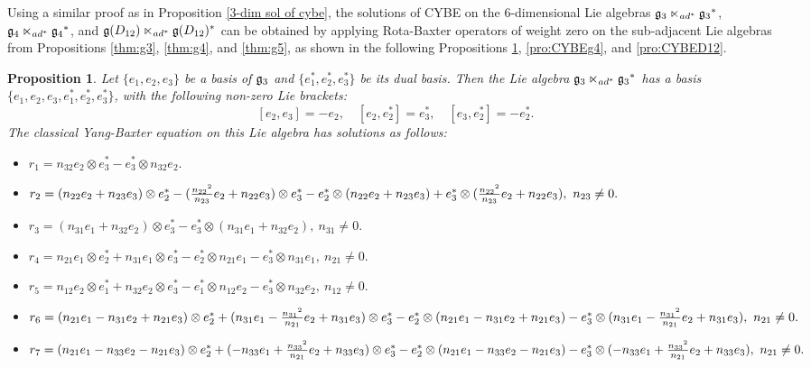 \documentclass[12pt, reqno]{amsart}
\theoremstyle{plain}
\newtheorem{proposition}[theorem]{Proposition}
\begin{document}
Using a similar proof as in Proposition \ref{3-dim sol of cybe}, the solutions of CYBE on the 6-dimensional Lie algebras ${\frak g_3} \ltimes_{{\rm ad}^{\ast}} {\frak g_3}^{\ast}$, ${\frak g_4} \ltimes_{{\rm ad}^{\ast}} {\frak g_4}^{\ast}$, and ${\frak g}(D_{12}) \ltimes_{{\rm ad}^{\ast}} {\frak g}(D_{12})^{\ast}$ can be obtained by applying Rota-Baxter operators of weight zero on the sub-adjacent Lie algebras from Propositions \ref{thm:g3}, \ref{thm:g4}, and \ref{thm:g5}, as shown in the following Propositions \ref{pro:CYBEg3}, \ref{pro:CYBEg4}, and \ref{pro:CYBED12}.
\begin{proposition}\label{pro:CYBEg3}
Let $\{e_{1}, e_{2}, e_{3}\}$ be a basis of ${\frak g_3}$ and $\{e^{\ast}_{1}, e^{\ast}_{2}, e^{\ast}_{3}\}$ be its dual basis. Then the Lie algebra ${\frak g_3} \ltimes_{{\rm ad}^{\ast}} {\frak g_3}^{\ast}$ has a basis $\{e_1,e_2,e_3,e_1^{\ast},e_2^{\ast},e^{\ast}_{3}\}$, with the following non-zero Lie brackets:  
$$  
[e_2,e_3]=-e_2,\quad [e_2,e^{\ast}_{2}]=e^{\ast}_{3},\quad [e_3,e^{\ast}_{2}]=-e^{\ast}_{2}.  
$$  
The classical Yang-Baxter equation on this Lie algebra has solutions as follows:

\begin{itemize}
\item[] \hskip-0.5cm  $r_1 =n_{32}e_2 \otimes e_3^{\ast}-e_3^{\ast} \otimes n_{32}e_2 .$
\item[] \hskip-0.5cm  $r_2 = (n_{22}e_2+{n_{23}}e_3) \otimes e_2^{\ast}-(\frac{{n_{22}}^2}{n_{23}}e_2+n_{22}e_3) \otimes e_3^{\ast}\\
  -e_2^{\ast} \otimes (n_{22}e_2+{n_{23}}e_3)+ e_3^{\ast}\otimes (\frac{{n_{22}}^2}{n_{23}}e_2+n_{22}e_3),~n_{23}\neq0.$
\item[]\hskip-0.5cm  $ r_3=(n_{31}e_1+n_{32}e_2)\otimes e_3^{\ast}-e_3^{\ast}\otimes(n_{31}e_1+n_{32}e_2),~n_{31}\neq0.$
\item[]\hskip-0.5cm  $r_4=n_{21}e_1 \otimes e_2^{\ast}+n_{31}e_1 \otimes e_3^{\ast}-e_2^{\ast} \otimes n_{21}e_1- e_3^{\ast}\otimes n_{31}e_1,~n_{21}\neq0.$
\item[]\hskip-0.5cm  $r_5 =n_{12}e_2 \otimes e_1^{\ast}+n_{32}e_2 \otimes e_3^{\ast}-e_1^{\ast} \otimes n_{12}e_2- e_3^{\ast}\otimes n_{32}e_2,~n_{12}\neq0.$
\item[]\hskip-0.5cm  $r_6 =(n_{21}e_1-n_{31}e_2+{n_{21}}e_3) \otimes e_2^{\ast}+(n_{31}e_1-\frac{{n_{31}}^2}{n_{21}}e_2+n_{31}e_3) \otimes e_3^{\ast}\\
  -e_2^{\ast} \otimes (n_{21}e_1-n_{31}e_2+{n_{21}}e_3)- e_3^{\ast}\otimes (n_{31}e_1-\frac{{n_{31}}^2}{n_{21}}e_2+n_{31}e_3),~n_{21}\neq0.$
\item[]\hskip-0.5cm  $ r_7 = (n_{21}e_1-n_{33}e_2-{n_{21}}e_3) \otimes e_2^{\ast}+(-n_{33}e_1+\frac{{n_{33}}^2}{n_{21}}e_2+n_{33}e_3) \otimes e_3^{\ast}\\
  -e_2^{\ast} \otimes (n_{21}e_1-n_{33}e_2-{n_{21}}e_3)- e_3^{\ast}\otimes (-n_{33}e_1+\frac{{n_{33}}^2}{n_{21}}e_2+n_{33}e_3),~n_{21}\neq0.$
\end{itemize}
\end{proposition}
\end{document}

